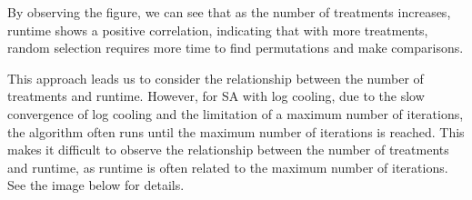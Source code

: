 \documentclass[
  a4paper,
  oneside,
  openany,
  12pt,
  onecolumn]{book}
\theoremstyle{plain}
\theoremstyle{definition}
\theoremstyle{remark}
\begin{document}
\begin{figure}


\caption{\label{fig-align}}

\end{figure}%

By observing the figure, we can see that as the number of treatments
increases, runtime shows a positive correlation, indicating that with
more treatments, random selection requires more time to find
permutations and make comparisons.

This approach leads us to consider the relationship between the number
of treatments and runtime. However, for SA with log cooling, due to the
slow convergence of log cooling and the limitation of a maximum number
of iterations, the algorithm often runs until the maximum number of
iterations is reached. This makes it difficult to observe the
relationship between the number of treatments and runtime, as runtime is
often related to the maximum number of iterations. See the image below
for details.
\end{document}
